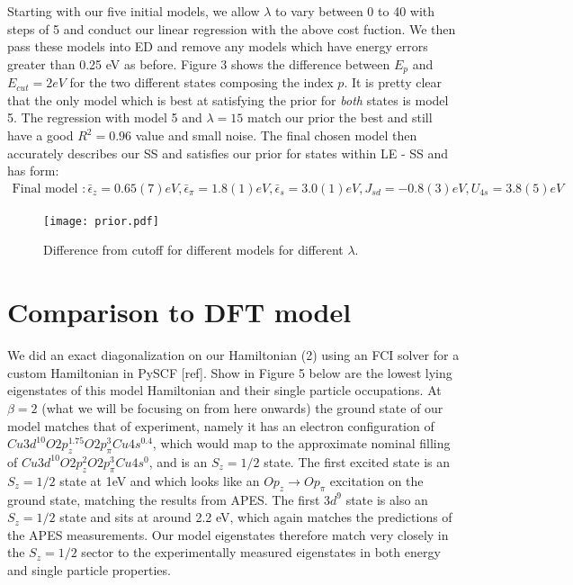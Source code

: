 \documentclass{article}
\begin{document}
Starting with our five initial models, we allow $\lambda$ to vary between 0 to 40 with steps of 5 and conduct our linear regression with the above cost fuction. We then pass these models into ED and remove any models which have energy errors greater than 0.25 eV as before. Figure 3 shows the difference between $E_p$ and $E_{cut} = 2eV$ for the two different states composing the index $p$. It is pretty clear that the only model which is best at satisfying the prior for \textit{both} states is model 5. The regression with model 5 and $\lambda = 15$ match our prior the best and still have a good $R^2 = 0.96$ value and small noise. The final chosen model then accurately describes our SS and satisfies our prior for states within LE - SS and has form: 
\begin{multline}
 \boxed{\text{Final model }: \bar{\epsilon}_z = 0.65(7) eV, \bar{\epsilon}_\pi = 1.8(1) eV, \bar{\epsilon}_s = 3.0(1) eV, J_{sd} = -0.8(3) eV, U_{4s} = 3.8(5) eV}
\end{multline}

\begin{figure}[H]
\centering
\texttt{[image: prior.pdf]}
\label{fig:extrap}
\caption{Difference from cutoff for different models for different $\lambda$.}
\end{figure}

\section{Comparison to DFT model}
We did an exact diagonalization on our Hamiltonian (2) using an FCI solver for a custom Hamiltonian in PySCF [ref]. Show in Figure 5 below are the lowest lying eigenstates of this model Hamiltonian and their single particle occupations. At $\beta=2$ (what we will be focusing on from here onwards) the ground state of our model matches that of experiment, namely it has an electron configuration of $Cu 3d^{10} O 2p_z^{1.75} O 2p_\pi^3 Cu 4s^{0.4}$, which would map to the approximate nominal filling of $Cu 3d^{10} O 2p_z^{2} O 2p_\pi^3 Cu 4s^{0}$, and is an $S_z=1/2$ state. The first excited state is an $S_z=1/2$ state at 1eV and which looks like an $O p_z \rightarrow O p_\pi$ excitation on the ground state, matching the results from APES. The first $3d^9$ state is also an $S_z=1/2$ state and sits at around 2.2 eV, which again matches the predictions of the APES measurements. Our model eigenstates therefore match very closely in the $S_z=1/2$ sector to the experimentally measured eigenstates in both energy and single particle properties.
\end{document}
